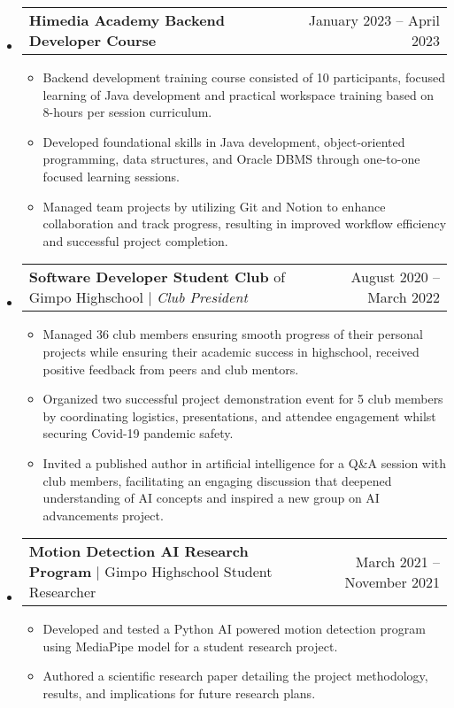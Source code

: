 \documentclass[letterpaper,11pt]{article}
\makeatletter
\newcommand{\resumeItem}[1]{
  \item\small{
    {#1 \vspace{-5pt}}
  }
}
\newcommand{\resumeProjectHeading}[2]{
    \item
    \begin{tabular*}{0.97\textwidth}{l@{\extracolsep{\fill}}r@{\hspace{-0.2in}}}
        \small#1 & #2 \\
    \end{tabular*}\vspace{-7pt}
}
\newcommand{\resumeSubHeadingListStart}{\begin{itemize}[leftmargin=0.00in, rightmargin=-0.2in, label={}]}
\newcommand{\resumeSubHeadingListEnd}{\end{itemize}}
\newcommand{\resumeItemListStart}{\begin{itemize}[leftmargin=0.15in, rightmargin=0.15in]}
\newcommand{\resumeItemListEnd}{\end{itemize}\vspace{-7pt}}
\makeatother
\begin{document}
    \resumeSubHeadingListStart
        \resumeProjectHeading
            {\textbf{Himedia Academy Backend Developer Course}}{January 2023 -- April 2023}
            \resumeItemListStart
                \resumeItem{Backend development training course consisted of 10 participants, focused learning of Java development and practical workspace training based on 8-hours per session curriculum.}
                \resumeItem{Developed foundational skills in Java development, object-oriented programming, data structures, and Oracle DBMS through one-to-one focused learning sessions.}
                \resumeItem{Managed team projects by utilizing Git and Notion to enhance collaboration and track progress, resulting in improved workflow efficiency and successful project completion.}
                \resumeItemListEnd
        \resumeSubHeadingListEnd

    \resumeSubHeadingListStart
        \resumeProjectHeading
            {\textbf{Software Developer Student Club} of Gimpo Highschool $|$ \emph{Club President}}{August 2020 -- March 2022}
            \resumeItemListStart
                \resumeItem{Managed 36 club members ensuring smooth progress of their personal projects while ensuring their academic success in highschool, received positive feedback from peers and club mentors.}
                \resumeItem{Organized two successful project demonstration event for 5 club members by coordinating logistics, presentations, and attendee engagement whilst securing Covid-19 pandemic safety.}
                \resumeItem{Invited a published author in artificial intelligence for a Q\&A session with club members, facilitating an engaging discussion that deepened understanding of AI concepts and inspired a new group on AI advancements project.}
            \resumeItemListEnd
        \resumeSubHeadingListEnd

    \resumeSubHeadingListStart
        \resumeProjectHeading
            {\textbf{Motion Detection AI Research Program} $|$ Gimpo Highschool Student Researcher}{March 2021 -- November 2021}
            \resumeItemListStart
                \resumeItem{Developed and tested a Python AI powered motion detection program using MediaPipe model for a student research project.}
                \resumeItem{Authored a scientific research paper detailing the project methodology, results, and implications for future research plans.}
            \resumeItemListEnd
        \resumeSubHeadingListEnd
\end{document}
